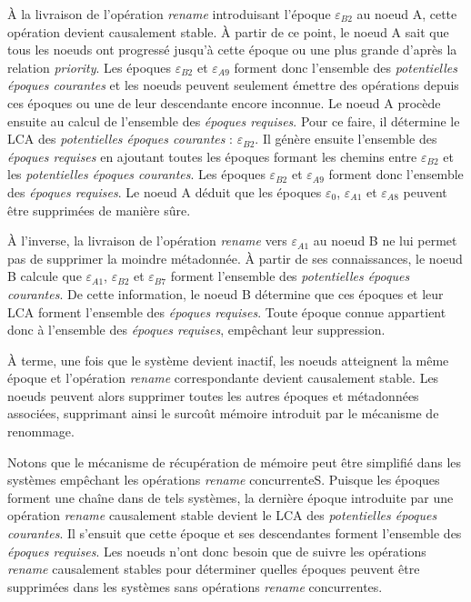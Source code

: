 \documentclass[12pt]{thesul}
\newcommand{\epoch}[1]{$\varepsilon_{#1}$}
\begin{document}
À la livraison de l'opération \emph{rename} introduisant l'époque \epoch{B2} au noeud A, cette opération devient causalement stable.
À partir de ce point, le noeud A sait que tous les noeuds ont progressé jusqu'à cette époque ou une plus grande d'après la relation \emph{priority}.
Les époques \epoch{B2} et \epoch{A9} forment donc l'ensemble des \emph{potentielles époques courantes} et les noeuds peuvent seulement émettre des opérations depuis ces époques ou une de leur descendante encore inconnue.
Le noeud A procède ensuite au calcul de l'ensemble des \emph{époques requises}.
Pour ce faire, il détermine le \ac{LCA} des \emph{potentielles époques courantes} : \epoch{B2}.
Il génère ensuite l'ensemble des \emph{époques requises} en ajoutant toutes les époques formant les chemins entre \epoch{B2} et les \emph{potentielles époques courantes}.
Les époques \epoch{B2} et \epoch{A9} forment donc l'ensemble des \emph{époques requises}.
Le noeud A déduit que les époques \epoch{0}, \epoch{A1} et \epoch{A8} peuvent être supprimées de manière sûre.

À l'inverse, la livraison de l'opération \emph{rename} vers \epoch{A1} au noeud B ne lui permet pas de supprimer la moindre métadonnée.
À partir de ses connaissances, le noeud B calcule que \epoch{A1}, \epoch{B2} et \epoch{B7} forment l'ensemble des \emph{potentielles époques courantes}.
De cette information, le noeud B détermine que ces époques et leur \ac{LCA} forment l'ensemble des \emph{époques requises}.
Toute époque connue appartient donc à l'ensemble des \emph{époques requises}, empêchant leur suppression.

À terme, une fois que le système devient inactif, les noeuds atteignent la même époque et l'opération \emph{rename} correspondante devient causalement stable.
Les noeuds peuvent alors supprimer toutes les autres époques et métadonnées associées, supprimant ainsi le surcoût mémoire introduit par le mécanisme de renommage.

Notons que le mécanisme de récupération de mémoire peut être simplifié dans les systèmes empêchant les opérations \emph{rename} concurrenteS.
Puisque les époques forment une chaîne dans de tels systèmes, la dernière époque introduite par une opération \emph{rename} causalement stable devient le \ac{LCA} des \emph{potentielles époques courantes}.
Il s'ensuit que cette époque et ses descendantes forment l'ensemble des \emph{époques requises}.
Les noeuds n'ont donc besoin que de suivre les opérations \emph{rename} causalement stables pour déterminer quelles époques peuvent être supprimées dans les systèmes sans opérations \emph{rename} concurrentes.
\end{document}
